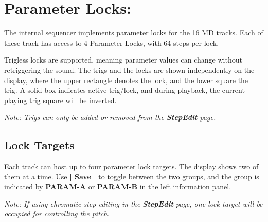 \chapter{Parameter Locks:}
The internal sequencer implements parameter locks for the 16 MD tracks. Each of these track has access to 4 Parameter Locks, with 64 steps per lock. 


Trigless locks are supported, meaning parameter values can change without retriggering the sound.
The trigs and the locks are shown independently on the display, where the upper rectangle denotes the lock, and the lower square the trig.
A solid box indicates active trig/lock, and during playback, the current playing trig square will be inverted.


\textit{Note: Trigs can only be added or removed from the \textbf{StepEdit} page.}

\section{Lock Targets}

Each track can host up to four parameter lock targets. The display shows two of them at a time. Use \textbf{[ Save ]} to toggle between the two groups, and the group is indicated by \textbf{PARAM-A} or \textbf{PARAM-B} in the left information panel.

\textit{Note: If using chromatic step editing in the \textbf{StepEdit} page, one lock target will be occupied for controlling the pitch.}